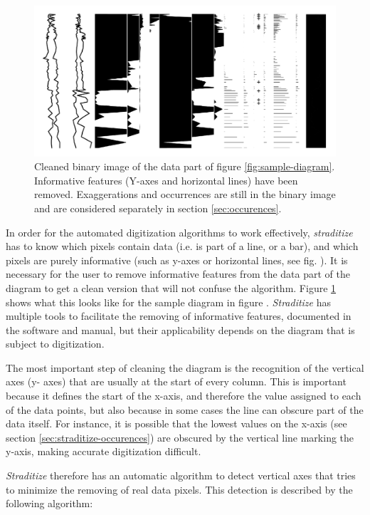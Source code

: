 \begin{refsection}
\begin{figure}
	\includegraphics[width=\linewidth]{straditize-figures/sample-diagram-data.pdf}
	\caption[Cleaned binary image of the data part]{Cleaned binary image of the data part of figure \ref{fig:sample-diagram}. Informative features (Y-axes and horizontal lines) have been removed. Exaggerations and occurrences are still in the binary image and are considered separately in section \ref{sec:occurences}.}
	\label{fig:cleaned-sample}
\end{figure}

In order for the automated digitization algorithms to work effectively, \emph{straditize} has to know which pixels contain data (i.e. is part of a line, or a bar), and which pixels are purely informative (such as y-axes or horizontal lines, see fig. \samplediagram[l]). It is necessary for the user to remove informative features from the data part of the diagram to get a clean version that will not confuse the algorithm. Figure \ref{fig:cleaned-sample} shows what this looks like for the sample diagram in figure \samplediagram. \emph{Straditize} has multiple tools to facilitate the removing of informative features, documented in the software and manual, but their applicability depends on the diagram that is subject to digitization.

The most important step of cleaning the diagram is the recognition of the vertical axes (y- axes) that are usually at the start of every column. This is important because it defines the start of the x-axis, and therefore the value assigned to each of the data points, but also because in some cases the line can obscure part of the data itself. For instance, it is possible that the lowest values on the x-axis (see section \ref{sec:straditize-occurences}) are obscured by the vertical line marking the y-axis, making accurate digitization difficult.

\emph{Straditize} therefore has an automatic algorithm to detect vertical axes that tries to minimize the removing of real data pixels. This detection is described by the following algorithm:


\end{refsection}
